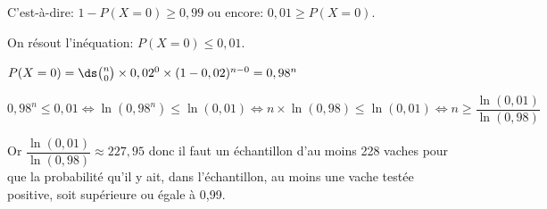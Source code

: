 \begin{enumerate}
C'est-à-dire:
$1-P(X=0) \geqslant 0,99$
ou encore:
$0,01\geqslant P(X=0)$.

On résout l'inéquation: $P(X=0)\leqslant 0,01$.

$P(X=0) = \ds\binom{n}{0}\times 0,02^{0}\times (1-0,02)^{n-0}=0,98^n$

$0,98^n \leqslant 0,01
\iff
\ln\left (0,98^n\right ) \leqslant \ln(0,01)
\iff
n\times \ln (0,98 ) \leqslant \ln(0,01)
\iff
n \geqslant \dfrac{\ln(0,01)}{\ln(0,98)}$

Or $\dfrac{\ln(0,01)}{\ln(0,98)} \approx 227,95$
donc il faut un échantillon d'au moins 228 vaches pour que la probabilité qu'il y ait, dans l'échantillon, au moins une vache testée positive, soit supérieure ou égale à 0,99.

\end{enumerate}

\vspace{1cm}
